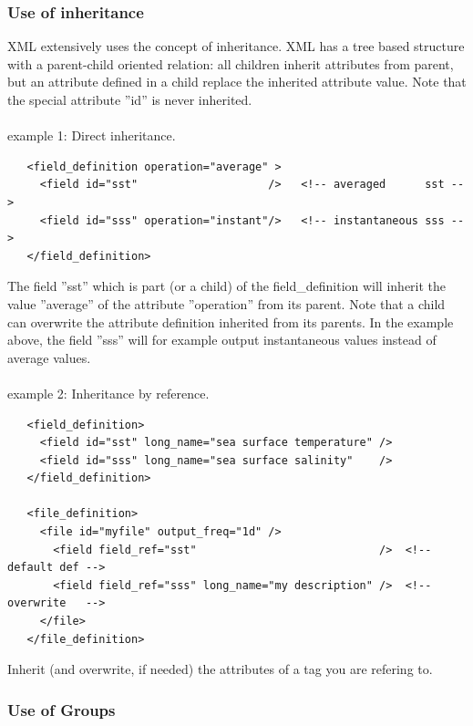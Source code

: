\subsubsection{Use of inheritance}

XML extensively uses the concept of inheritance. XML has a tree based structure with a parent-child oriented relation: all children inherit attributes from parent, but an attribute defined in a child replace the inherited attribute value. Note that the special attribute ''id'' is never inherited.  \\
\\
example 1: Direct inheritance.
\vspace{-20pt}
\begin{alltt}  {{\scriptsize    
\begin{verbatim}
   <field_definition operation="average" >
     <field id="sst"                    />   <!-- averaged      sst --> 
     <field id="sss" operation="instant"/>   <!-- instantaneous sss --> 
   </field_definition> 
\end{verbatim}
}}\end{alltt} 

The field ''sst'' which is part (or a child) of the field\_definition will inherit the value ''average'' 
of the attribute ''operation'' from its parent. Note that a child can overwrite 
the attribute definition inherited from its parents. In the example above, the field ''sss'' will 
for example output instantaneous values instead of average values. \\
\\
example 2: Inheritance by reference.
\vspace{-20pt}
\begin{alltt}  {{\scriptsize
\begin{verbatim}
   <field_definition>
     <field id="sst" long_name="sea surface temperature" />   
     <field id="sss" long_name="sea surface salinity"    />  
   </field_definition>      

   <file_definition>
     <file id="myfile" output_freq="1d" />   
       <field field_ref="sst"                            />  <!-- default def -->
       <field field_ref="sss" long_name="my description" />  <!-- overwrite   -->
     </file>   
   </file_definition> 
\end{verbatim}
}}\end{alltt} 
Inherit (and overwrite, if needed) the attributes of a tag you are refering to.

\subsubsection{Use of Groups}

